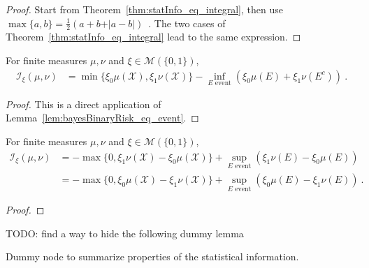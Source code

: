 \begin{proof}\leanok
{}
Start from Theorem~\ref{thm:statInfo_eq_integral}, then use $\max\{a,b\} = \frac{1}{2}\left( a + b + \vert a - b \vert \right)$~.
The two cases of Theorem~\ref{thm:statInfo_eq_integral} lead to the same expression.
\end{proof}


\begin{lemma}
  \label{lem:statInfo_eq_sub_inf_event}
  \leanok
  For finite measures $\mu, \nu$ and $\xi \in \mathcal M(\{0,1\})$,
  \begin{align*}
  \mathcal I_\xi(\mu, \nu)
  &= \min\{\xi_0 \mu(\mathcal X), \xi_1 \nu(\mathcal X)\} - \inf_{E \text{ event}} \left( \xi_0 \mu(E) + \xi_1 \nu(E^c) \right)
  \: .
  \end{align*}
\end{lemma}

\begin{proof}\leanok
{}
This is a direct application of Lemma~\ref{lem:bayesBinaryRisk_eq_event}.
\end{proof}


\begin{lemma}
  \label{lem:statInfo_eq_sup_event}
  For finite measures $\mu, \nu$ and $\xi \in \mathcal M(\{0,1\})$,
  \begin{align*}
  \mathcal I_\xi(\mu, \nu)
  &= - \max\{0, \xi_1 \nu(\mathcal X) - \xi_0 \mu(\mathcal X) \} + \sup_{E \text{ event}} \left( \xi_1 \nu(E) - \xi_0 \mu(E) \right)
  \\
  &= - \max\{0, \xi_0 \mu(\mathcal X) - \xi_1 \nu(\mathcal X) \} + \sup_{E \text{ event}} \left( \xi_0 \mu(E) - \xi_1 \nu(E) \right)
  \: .
  \end{align*}
\end{lemma}

\begin{proof}%
{}

\end{proof}


TODO: find a way to hide the following dummy lemma
\begin{lemma}
  \label{lem:statInfo_properties}
  \leanok
  Dummy node to summarize properties of the statistical information.
\end{lemma}


